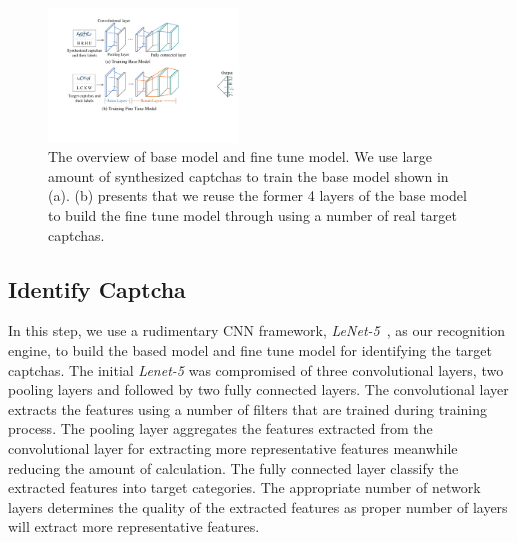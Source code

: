 %

\begin{figure}[!t]
  \centering
  \includegraphics[width=0.45\textwidth]{fig/cnn_model.pdf}
  \caption{The overview of base model and fine tune model. We use large amount of synthesized captchas to train the base model shown in (a). (b) presents that we reuse the former 4 layers of the base model to build the fine tune model through using a number of real target captchas.}
  \label{fig: cnn_model}
\end{figure}

\subsection{Identify Captcha}
In this step, we use a rudimentary CNN framework, \emph{LeNet-5}~\cite{Lecun1998Gradient}, as our recognition engine, to build the based model and fine tune model for identifying the target captchas.
The initial \emph{Lenet-5} was compromised of three convolutional layers, two pooling layers and followed by two fully connected layers.
The convolutional layer extracts the features using a number of filters that are trained during training process. The pooling layer aggregates the features extracted from the convolutional layer for extracting more representative features meanwhile reducing the amount of calculation. The fully connected layer classify the extracted features into target categories. The appropriate number of network layers determines the quality of the extracted features as proper number of layers will extract more representative features.

